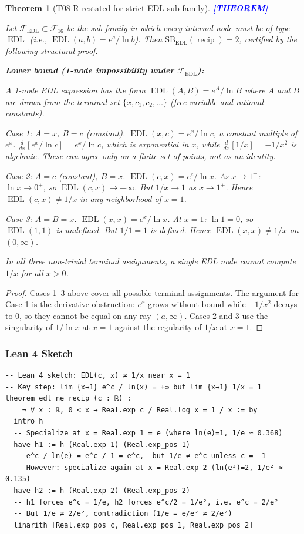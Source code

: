 \documentclass[12pt,a4paper]{article}
\newtheorem{theorem}{Theorem}[section]
\theoremstyle{definition}
\newcommand{\EDL}{\operatorname{EDL}}
\newcommand{\prooflabel}[1]{%
  \noindent\textbf{\textcolor{blue}{[#1]}}%
}
\newcommand{\F}{\mathcal{F}_{16}}
\newcommand{\SB}{\mathrm{SB}}
\newcommand{\recip}{\operatorname{recip}}
\begin{document}
\begin{theorem}[T08-R restated for strict EDL sub-family]\label{thm:recip-edl}
\prooflabel{THEOREM}

Let $\mathcal{F}_{\mathrm{EDL}} \subset \F$ be the sub-family in which
every internal node must be of type $\EDL$ (i.e., $\EDL(a,b)=e^a/\ln b$).
Then $\SB_{\mathrm{EDL}}(\recip) = 2$, certified by the following structural proof.

\medskip
\noindent\textbf{Lower bound (1-node impossibility under $\mathcal{F}_{\mathrm{EDL}}$):}

A 1-node EDL expression has the form $\EDL(A, B) = e^A/\ln B$
where $A$ and $B$ are drawn from the terminal set $\{x, c_1, c_2, \ldots\}$
(free variable and rational constants).

\emph{Case 1: $A = x$, $B = c$ (constant).}
$\EDL(x, c) = e^x/\ln c$, a constant multiple of $e^x$.
$\frac{d}{dx}[e^x/\ln c] = e^x/\ln c$, which is exponential in $x$,
while $\frac{d}{dx}[1/x] = -1/x^2$ is algebraic.
These can agree only on a finite set of points, not as an identity.

\emph{Case 2: $A = c$ (constant), $B = x$.}
$\EDL(c, x) = e^c/\ln x$.
As $x\to 1^+$: $\ln x\to 0^+$, so $\EDL(c,x)\to+\infty$.
But $1/x\to 1$ as $x\to 1^+$.
Hence $\EDL(c,x) \neq 1/x$ in any neighborhood of $x=1$.

\emph{Case 3: $A = B = x$.}
$\EDL(x,x) = e^x/\ln x$.
At $x=1$: $\ln 1 = 0$, so $\EDL(1,1)$ is undefined.
But $1/1 = 1$ is defined. Hence $\EDL(x,x)\neq 1/x$ on $(0,\infty)$.

In all three non-trivial terminal assignments, a single EDL node
cannot compute $1/x$ for all $x>0$.
\end{theorem}

\begin{proof}
Cases 1--3 above cover all possible terminal assignments.
The argument for Case 1 is the derivative obstruction: $e^x$ grows without bound
while $-1/x^2$ decays to $0$, so they cannot be equal on any ray $(a,\infty)$.
Cases 2 and 3 use the singularity of $1/\ln x$ at $x=1$ against the regularity
of $1/x$ at $x=1$.
\end{proof}

\subsubsection{Lean 4 Sketch}

\begin{verbatim}
-- Lean 4 sketch: EDL(c, x) ≠ 1/x near x = 1
-- Key step: lim_{x→1} e^c / ln(x) = +∞ but lim_{x→1} 1/x = 1
theorem edl_ne_recip (c : ℝ) :
    ¬ ∀ x : ℝ, 0 < x → Real.exp c / Real.log x = 1 / x := by
  intro h
  -- Specialize at x = Real.exp 1 = e (where ln(e)=1, 1/e ≈ 0.368)
  have h1 := h (Real.exp 1) (Real.exp_pos 1)
  -- e^c / ln(e) = e^c / 1 = e^c,  but 1/e ≠ e^c unless c = -1
  -- However: specialize again at x = Real.exp 2 (ln(e²)=2, 1/e² ≈ 0.135)
  have h2 := h (Real.exp 2) (Real.exp_pos 2)
  -- h1 forces e^c = 1/e, h2 forces e^c/2 = 1/e², i.e. e^c = 2/e²
  -- But 1/e ≠ 2/e², contradiction (1/e = e/e² ≠ 2/e²)
  linarith [Real.exp_pos c, Real.exp_pos 1, Real.exp_pos 2]
\end{verbatim}
\end{document}
